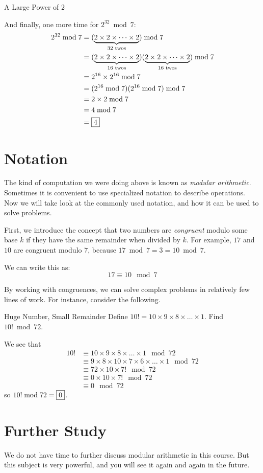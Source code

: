 \documentclass[a4paper,10pt]{report}
\begin{document}
\begin{problem}{A Large Power of $2$}
\begin{solution}
  And finally, one more time for $2^{32} \bmod 7$: \begin{align*}
   2^{32} \bmod 7
   &= (\underbrace{2 \times 2 \times \dots \times 2}_{32\text{ twos}}) \bmod 7 \\
   &= (\underbrace{2 \times 2 \times \dots \times 2}_{16\text{ twos}})
   (\underbrace{2 \times 2 \times \dots \times 2}_{16\text{ twos}}) \bmod 7 \\
   &= 2^{16}\times2^{16} \bmod 7 \\
   &= (2^{16} \bmod 7)(2^{16} \bmod 7) \bmod 7 \\
   &= 2 \times 2 \bmod 7 \\
   &= 4 \bmod 7 \\
   &= \Ans{4}
  \end{align*}

 \end{solution}
\end{problem}

\section{Notation}

The kind of computation we were doing above is known as \emph{modular
arithmetic}. Sometimes it is convenient to use specialized notation to describe
operations. Now we will take look at the commonly used notation, and how it can
be used to solve problems.

First, we introduce the concept that two numbers are \emph{congruent} modulo
some base $k$ if they have the same remainder when divided by $k$. For example,
$17$ and $10$ are congruent modulo $7$, because $17 \bmod 7 = 3 = 10 \bmod 7$.

We can write this as: \[
 17 \equiv 10 \mod 7
\]

By working with congruences, we can solve complex problems in relatively few
lines of work. For instance, consider the following.

\begin{problem}{Huge Number, Small Remainder}
 Define $10! = 10 \times 9 \times 8 \times \dots \times 1$. Find $10! \bmod 72$.

 \begin{solution}
  We see that \begin{align*}
   10!
   &\equiv 10 \times 9 \times 8 \times \dots \times 1 \mod 72 \\
   &\equiv 9 \times 8 \times 10 \times 7 \times 6 \times \dots \times 1
   \mod 72 \\
   &\equiv 72 \times 10 \times 7! \mod 72 \\
   &\equiv 0 \times 10 \times 7! \mod 72 \\
   &\equiv 0 \mod 72
  \end{align*}
  so $10! \bmod 72 = \Ans{0}$.
 \end{solution}
\end{problem}

\section{Further Study}

We do not have time to further discuss modular arithmetic in this course. But
this subject is very powerful, and you will see it again and again in the
future.

\printglossaries
\end{document}
